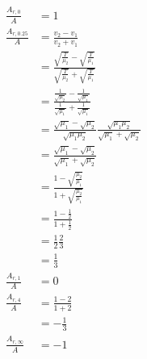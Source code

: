\documentclass{article}
\begin{document}
\begin{align*}
  \frac{A_{r,0}}{A}      & = 1                                                                                                             \\
  \frac{A_{r,0.25}}{A}   & = \frac{v_2 - v_1}{v_2 + v_1}                                                                                   \\
                         & = \frac{\sqrt{\frac{T}{\mu_2}} - \sqrt{\frac{T}{\mu_1}}}{\sqrt{\frac{T}{\mu_2}} + \sqrt{\frac{T}{\mu_1}}}       \\
                         & = \frac{\frac{1}{\sqrt{\mu_2}} - \frac{1}{\sqrt{\mu_1}}}{\frac{1}{\sqrt{\mu_1}} + \frac{1}{\sqrt{\mu_1}}}       \\
                         & = \frac{\sqrt{\mu_1} - \sqrt{\mu_2}}{\sqrt{\mu_1 \mu_2}} \frac{\sqrt{\mu_1 \mu_2}}{\sqrt{\mu_1} + \sqrt{\mu_2}} \\
                         & = \frac{\sqrt{\mu_1} - \sqrt{\mu_2}}{\sqrt{\mu_1} + \sqrt{\mu_2}}                                               \\
                         & = \frac{1 - \sqrt{\frac{\mu_2}{\mu_1}}}{1 + \sqrt{\frac{\mu_2}{\mu_1}}}                                         \\
                         & = \frac{1 - \frac{1}{2}}{1 + \frac{1}{2}}                                                                       \\
                         & = \frac{1}{2} \frac{2}{3}                                                                                       \\
                         & = \frac{1}{3}                                                                                                   \\
  \frac{A_{r,1}}{A}      & = 0                                                                                                             \\
  \frac{A_{r,4}}{A}      & = \frac{1 - 2}{1 + 2}                                                                                           \\
                         & = -\frac{1}{3}                                                                                                  \\
  \frac{A_{r,\infty}}{A} & = -1
\end{align*}
\end{document}
